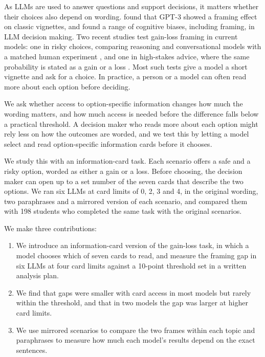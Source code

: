 \documentclass[11pt]{article}
\begin{document}
As LLMs are used to answer questions and support decisions, it matters whether their choices also depend on wording. \citet{binz2023using} found that GPT-3 showed a framing effect on classic vignettes, and \citet{echterhoff2024cognitive} found a range of cognitive biases, including framing, in LLM decision making. Two recent studies test gain-loss framing in current models: one in risky choices, comparing reasoning and conversational models with a matched human experiment \citep{ge2026mind}, and one in high-stakes advice, where the same probability is stated as a gain or a loss \citep{zhang2026same}. Most such tests give a model a short vignette and ask for a choice. In practice, a person or a model can often read more about each option before deciding.

We ask whether access to option-specific information changes how much the wording matters, and how much access is needed before the difference falls below a practical threshold. A decision maker who reads more about each option might rely less on how the outcomes are worded, and we test this by letting a model select and read option-specific information cards before it chooses.

We study this with an information-card task. Each scenario offers a safe and a risky option, worded as either a gain or a loss. Before choosing, the decision maker can open up to a set number of the seven cards that describe the two options. We ran six LLMs at card limits of 0, 2, 3 and 4, in the original wording, two paraphrases and a mirrored version of each scenario, and compared them with 198 students who completed the same task with the original scenarios.

We make three contributions:

\begin{enumerate}
  \item We introduce an information-card version of the gain-loss task, in which a model chooses which of seven cards to read, and measure the framing gap in six LLMs at four card limits against a 10-point threshold set in a written analysis plan.
  \item We find that gaps were smaller with card access in most models but rarely within the threshold, and that in two models the gap was larger at higher card limits.
  \item We use mirrored scenarios to compare the two frames within each topic and paraphrases to measure how much each model's results depend on the exact sentences.
\end{enumerate}
\end{document}
